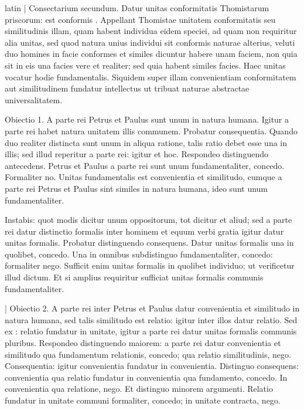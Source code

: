 \begin{otherlanguage*}{latin}
\pstart
\textnormal{|} Consectarium secundum. Datur unitas conformitatis Thomistarum priscorum:
est conformis . Appellant Thomistae unitatem conformitatis seu similitudinis illam, quam habent individua eidem speciei, ad quam non requiritur alia unitas, sed quod natura unius individui sit conformis naturae alterius, veluti duo homines in facie conformes et similes dicuntur habere unam faciem, non quia sit in eis una facies vere et realiter; sed quia habent similes facies. Haec unitas vocatur hodie fundamentalis. Siquidem super illam convenientiam conformitatem aut similitudinem fundatur intellectus ut tribuat naturae abstractae universalitatem. 
\pend

\pstart
Obiectio 1. A parte rei Petrus et Paulus sunt unum in natura humana. Igitur a parte rei habet natura unitatem illis communem. Probatur consequentia. Quando duo realiter distincta sunt unum in aliqua ratione, talis ratio debet esse una in illis; sed illud reperitur a parte rei:
igitur et hoc. Respondeo distinguendo antecedens. Petrus et Paulus a parte rei sunt unum fundamentaliter, concedo. Formaliter no. Unitas fundamentalis est convenientia et similitudo, cumque a parte rei Petrus et Paulus sint similes in natura humana, ideo sunt unum fundamentaliter. 
\pend

\pstart
Instabis:
quot modis dicitur unum oppositorum, tot dicitur et aliud; sed a parte rei datur distinctio formalis inter hominem et equum verbi gratia igitur datur unitas formalis. Probatur distinguendo consequens. Datur unitas formalis una in quolibet, concedo. Una in omnibus subdistinguo fundamentaliter, concedo:
formaliter nego. Sufficit enim unitas formalis in quolibet individuo; ut verificetur illud dictum. Et si amplius requiritur sufficiat unitas formalis communis fundamentaliter. 
\pend

\pstart
\textnormal{|} Obiectio 2. A parte rei inter Petrus et Paulus datur convenientia et similitudo in natura humana, sed talis similitudo est relatio:
igitur inter illos datur relatio. Sed ex :
relatio fundatur in unitate, igitur a parte rei datur unitas formalis communis pluribus. Respondeo distinguendo maiorem:
a parte rei datur convenientia et similitudo qua fundamentum relationis, concedo; qua relatio similitudinis, nego. Consequentia:
igitur convenientia fundatur in convenientia. Distinguo consequens:
convenientia qua relatio fundatur in convenientia qua fundamento, concedo. In convenientia qua relatione, nego. Et distinguo minorem argumenti. Relatio fundatur in unitate communi formaliter, concedo; in unitate contracta, nego. 
\pend


\end{otherlanguage*}
